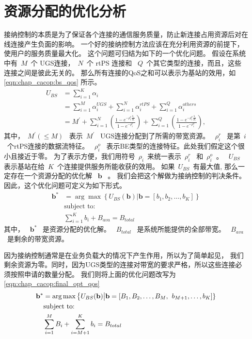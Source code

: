 \section{资源分配的优化分析}
接纳控制的本质是为了保证各个连接的通信服务质量，防止新连接占用资源后对在线连接产生负面的影响。
一个好的接纳控制方法应该在充分利用资源的前提下，使用户的服务质量最大化。
这个问题可归结为如下的一个优化问题。
假设在系统中有~$M$~个 UGS连接，~$N$~个 rtPS 连接和 ~$Q$~个其它类型的连接，而且，这些连接之间是彼此无关的。
那么所有连接的QoS之和可以表示为基站的效用，如\eqref{eqn:chap_cacop:bs_qos} 所示。
\begin{align}
U_{BS} &= \displaystyle \sum_{i=1}^K \alpha_i \nonumber \\
&= \sum_{i=1}^M\alpha_i^{UGS} + \sum_{i=1}^N\alpha_i^{rtPS} + \sum_{i=1}^Q\alpha_i^{others} \nonumber \\
&=\displaystyle M^\prime + \sum_{i=1}^N \left( \frac{1- e^{-\rho_i^r
\frac{b_i}{B_i} }}{1-e^{-\rho_i^r}} \right)
 + \sum_{i=1}^Q \left( \frac{1- e^{-\rho_i^o
\frac{b_i}{B_i} }}{1-e^{-\rho_i^o}} \right),
\label{eqn:chap_cacop:bs_qos}
\end{align}
其中，~$M^\prime(\le M)$~ 表示~$M^\prime$~ UGS连接分配到了所需的带宽资源。
~$\rho_i^r$~ 是第~$i$~个rtPS连接的数据流特征。 
~$\rho_i^o$~ 表示BE类型的连接特征。此处我们假定这个很小且接近于零。
为了表示方便，我们用符号~$\rho_i$~来统一表示~$\rho_i^r$~ 和~$\rho_i^o$~。
~$U_{BS}$~ 表示基站在给~$K$~个连接提供服务所能收获的效用。
如果~$U_{BS}$~有最大值, 那么一定存在一个资源分配的优化解
~$\mathbf{b}$~ 。
我们会把这个解做为接纳控制的判决条件。
因此，这个优化问题可定义为如下形式。
\begin{align}
\mathbf{b}^* &= \arg \max \left\{ U_{BS}(\mathbf{b}) \big| \mathbf{b} = [b_1, b_2, \dots, b_K] \right\} \label{eqn_u_bs_qos}\\
&\text{subject to:}\nonumber\\
&\displaystyle\sum_{i=1}^{K}b_i + B_{ava}= B_{total} \nonumber
\end{align}
其中， ~$\mathbf{b}^*$~ 是资源分配的优化解。
~$B_{total}$~ 是系统所能提供的全部带宽。
~$ B_{ava} $~是剩余的带宽资源。

因为接纳控制通常是在业务负载大的情况下产生作用，所以为了简单起见，
我们剩余资源为零。同时，因为UGS类型的连接对带宽的要求严格，所以这些连接必须按照申请的数量分配。
我们则将上面的优化问题改写为 \eqref{eqn:chap_cacop:final_opt_qos}
\begin{align}{}
\label{eqn:chap_cacop:final_opt_qos}
\mathbf{b}^* &= \arg \max \left\{ U_{BS}(\mathbf{b}) \big| \mathbf{b} = [B_1, B_2, \dots,B_M,\right.
 \left. b_{M+1}, \ldots, b_K] \right\} \\
&\text{subject to:}\notag \\
&\sum_{i=1}^M B_i + \sum_{i=M+1}^{K}b_i= B_{total} \notag
\end{align}


